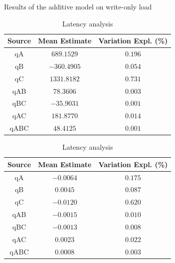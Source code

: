 \documentclass[11pt,a4paper]{article}
\begin{document}
\begin{table}[h!]
\centering
\small
{Results of the additive model on write-only load}
\begin{minipage}{.5\textwidth}
\centering
	\begin{tabular}{|c|c|c|}
	\hline 
	{\small Source} & {\small Mean Estimate} & {\small Variation Expl. (\%)} \\ 
	\hline 
	qA & $689.1529$ & $0.196$ \\ 
	\hline 
	qB & $-360.4905$ & $0.054$ \\ 
	\hline 
	qC & $1331.8182$ & $0.731$ \\ 
	\hline 
	qAB & $78.3606$ & $0.003$ \\ 
	\hline 
	qBC & $-35.9031$ & $0.001$ \\ 
	\hline 
	qAC & $181.8770$ & $0.014$ \\ 
	\hline 
	qABC & $48.4125$ & $0.001$ \\ 
	\hline 
	\end{tabular} \caption{Throughput analysis} \label{tab:2k-add-wo-tpt}
\end{minipage}%
\begin{minipage}{.5\textwidth}
\centering
	\begin{tabular}{|c|c|c|}
	\hline 
	{\small Source} & {\small Mean Estimate} & {\small Variation Expl. (\%)} \\ 
	\hline 
	qA & $-0.0064$ & $0.175$ \\ 
	\hline 
	qB & $0.0045$ & $0.087$ \\ 
	\hline 
	qC & $-0.0120$ & $0.620$ \\ 
	\hline 
	qAB & $-0.0015$ & $0.010$ \\ 
	\hline 
	qBC & $-0.0013$ & $0.008$ \\ 
	\hline 
	qAC & $0.0023$ & $0.022$ \\ 
	\hline 
	qABC & $0.0008$ & $0.003$ \\ 
	\hline 
	\end{tabular} \caption{Latency analysis} \label{tab:2k-add-wo-lat}
\end{minipage}
\end{table}\label{tab:2k-add-wo}
\end{document}
